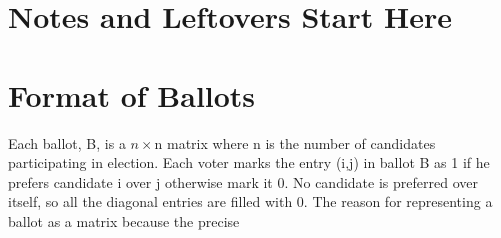 \documentclass{llncs}
\begin{document}
\appendix
\section*{Notes and Leftovers Start Here}



\section{Format of Ballots}

  Each ballot, B, is a $n\times$n matrix where n is the number of candidates 
  participating in
  election. Each voter marks the entry (i,j) in ballot B as 1 if he prefers 
  candidate i over j
  otherwise mark it 0. No candidate is preferred over itself, so all the 
  diagonal entries are 
  filled with 0. 
  The reason for representing a ballot as a matrix because the precise 
\end{document}
